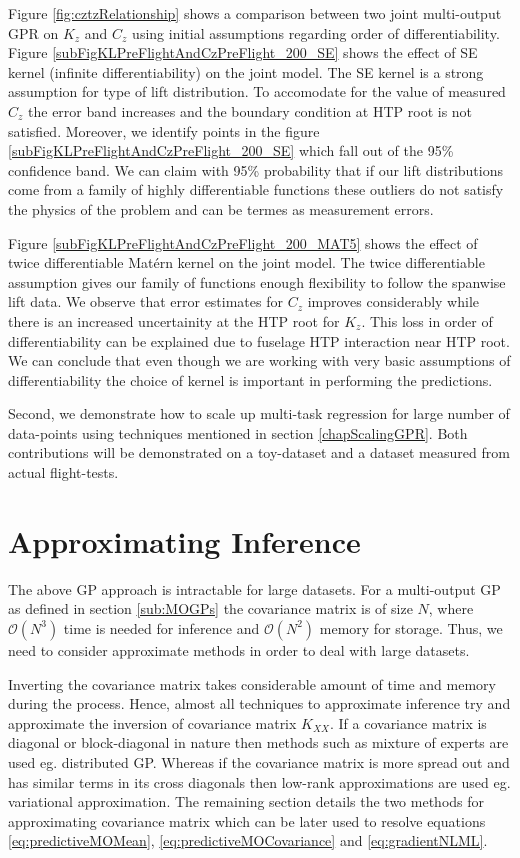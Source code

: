 Figure \ref{fig:cztzRelationship} shows a comparison between two joint multi-output GPR on \(K_{z}\) and \(C_{z}\) using initial assumptions regarding order of differentiability. Figure \ref{subFigKLPreFlightAndCzPreFlight_200_SE} shows the effect of SE kernel (infinite differentiability) on the joint model. The SE kernel is a strong assumption for type of lift distribution. To accomodate for the value of measured \(C_{z}\) the error band increases and the boundary condition at HTP root is not satisfied. Moreover, we identify points in the figure \ref{subFigKLPreFlightAndCzPreFlight_200_SE} which fall out of the 95\% confidence band. We can claim with 95\% probability that if our lift distributions come from a family of highly differentiable functions these outliers do not satisfy the physics of the problem and can be termes as measurement errors.

Figure \ref{subFigKLPreFlightAndCzPreFlight_200_MAT5} shows the effect of twice differentiable Mat\'ern kernel on the joint model. The twice differentiable assumption gives our family of functions enough flexibility to follow the spanwise lift data. We observe that error estimates for \(C_{z}\) improves considerably while there is an increased uncertainity at the HTP root for \(K_{z}\). This loss in order of differentiability can be explained due to fuselage HTP interaction near HTP root. We can conclude that even though we are working with very basic assumptions of differentiability the choice of kernel is important in performing the predictions. 

Second, we demonstrate how to scale up multi-task regression for large number of data-points using techniques mentioned in section \ref{chapScalingGPR}. Both contributions will be demonstrated on a toy-dataset and a dataset measured from actual flight-tests.


\section{Approximating Inference}\label{sec:sparseGPRegression}
\noindent The above GP approach is intractable for large datasets. For a multi-output GP as defined in section \ref{sub:MOGPs} the covariance matrix is of size \(N\),  where \(\mathcal{O}\left ( N^{3} \right )\) time is needed for inference and \(\mathcal{O}\left ( N^{2} \right )\) memory for storage. Thus, we need to consider approximate methods in order to deal with large datasets. 

Inverting the covariance matrix takes considerable amount of time and memory during the process. Hence, almost all techniques to approximate inference try and approximate the inversion of covariance matrix \(K_{XX}\). If a covariance matrix is diagonal or block-diagonal in nature then methods such as mixture of experts are used eg. distributed GP. Whereas if the covariance matrix is more spread out and has similar terms in its cross diagonals then low-rank approximations are used eg. variational approximation. The remaining section details the two methods for approximating covariance matrix which can be later used to resolve equations \ref{eq:predictiveMOMean}, \ref{eq:predictiveMOCovariance} and \ref{eq:gradientNLML}.

